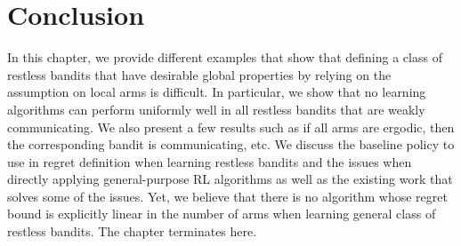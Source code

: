 \section{Conclusion}
\label{ch:restless:sec:conclude}

In this chapter, we provide different examples that show that defining a class of restless bandits that have desirable global properties by relying on the assumption on local arms is difficult.
In particular, we show that no learning algorithms can perform uniformly well in all restless bandits that are weakly communicating.
We also present a few results such as if all arms are ergodic, then the corresponding bandit is communicating, etc.
We discuss the baseline policy to use in regret definition when learning restless bandits and the issues when directly applying general-purpose RL algorithms as well as the existing work that solves some of the issues.
Yet, we believe that there is no algorithm whose regret bound is explicitly linear in the number of arms when learning general class of restless bandits.
The chapter terminates here.

